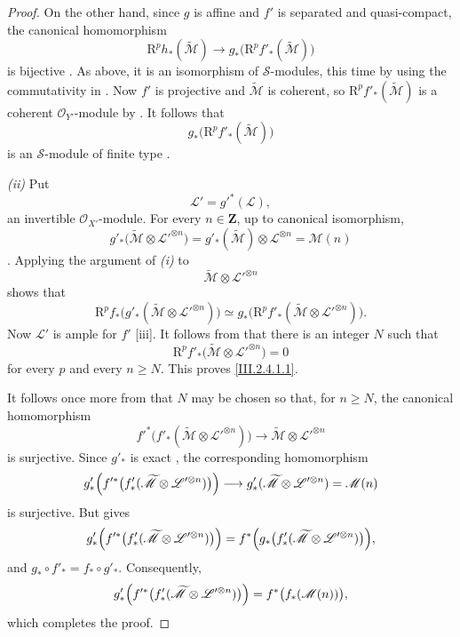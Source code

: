 \documentclass[oneside]{amsart}
\theoremstyle{ega-env-style}
\theoremstyle{ega-thm-env-style}
\theoremstyle{ega-defn-env-style}
\def\mathcal{\mathscr}
\def\sh{\mathcal}                   %
\def\bb{\mathbf}                    %
\def\geq{\geqslant}                 %
\def\RR{\mathrm{R}}                 %
\begin{document}
\begin{proof}
On the other hand, since $g$ is affine and $f'$ is separated and quasi-compact, the canonical homomorphism
\[
  \RR^p h_*(\widetilde{\sh{M}})
  \longrightarrow
  g_*\bigl(\RR^p f'_*(\widetilde{\sh{M}})\bigr)
\]
is bijective .
As above, it is an isomorphism of $\sh{S}$-modules, this time by using the commutativity in .
Now $f'$ is projective and $\widetilde{\sh{M}}$ is coherent, so $\RR^p f'_*(\widetilde{\sh{M}})$ is a coherent $\sh{O}_{Y'}$-module by .
It follows that
\[
  g_*\bigl(\RR^p f'_*(\widetilde{\sh{M}})\bigr)
\]
is an $\sh{S}$-module of finite type .

\emph{(ii)} Put
\[
  \sh{L}'=g'^*(\sh{L}),
\]
an invertible $\sh{O}_{X'}$-module.
For every $n\in\bb Z$, up to canonical isomorphism,
\[
  g'_*\bigl(\widetilde{\sh{M}}\otimes\sh{L}'^{\otimes n}\bigr)
  =
  g'_*(\widetilde{\sh{M}})\otimes\sh{L}^{\otimes n}
  =
  \sh{M}(n)
\]
.
Applying the argument of \emph{(i)} to
\[
  \widetilde{\sh{M}}\otimes\sh{L}'^{\otimes n}
\]
shows that
\[
  \RR^p f_*
  \bigl(g'_*(\widetilde{\sh{M}}\otimes\sh{L}'^{\otimes n})\bigr)
  \simeq
  g_*\bigl(\RR^p f'_*
  (\widetilde{\sh{M}}\otimes\sh{L}'^{\otimes n})\bigr).
\]
Now $\sh{L}'$ is ample for $f'$ [iii].
It follows from  that there is an integer $N$ such that
\[
  \RR^p f'_*
  \bigl(\widetilde{\sh{M}}\otimes\sh{L}'^{\otimes n}\bigr)=0
\]
for every $p$ and every $n\geq N$.
This proves \eqref{III.2.4.1.1}.

It follows once more from  that $N$ may be chosen so that, for $n\geq N$, the canonical homomorphism
\[
  f'^*\bigl(f'_*(\widetilde{\sh{M}}\otimes\sh{L}'^{\otimes n})\bigr)
  \longrightarrow
  \widetilde{\sh{M}}\otimes\sh{L}'^{\otimes n}
\]
is surjective.
Since $g'_*$ is exact , the corresponding homomorphism
\[
  g'_*\Bigl(
    f'^*\bigl(f'_*(\widetilde{\sh{M}}\otimes\sh{L}'^{\otimes n})\bigr)
  \Bigr)
  \longrightarrow
  g'_*(\widetilde{\sh{M}}\otimes\sh{L}'^{\otimes n})
  =\sh{M}(n)
\]
is surjective.
But  gives
\[
  g'_*\Bigl(
    f'^*\bigl(f'_*(\widetilde{\sh{M}}\otimes\sh{L}'^{\otimes n})\bigr)
  \Bigr)
  =
  f^*\Bigl(
    g_*\bigl(f'_*(\widetilde{\sh{M}}\otimes\sh{L}'^{\otimes n})\bigr)
  \Bigr),
\]
and $g_*\circ f'_*=f_*\circ g'_*$.
Consequently,
\[
  g'_*\Bigl(
    f'^*\bigl(f'_*(\widetilde{\sh{M}}\otimes\sh{L}'^{\otimes n})\bigr)
  \Bigr)
  =
  f^*\bigl(f_*(\sh{M}(n))\bigr),
\]
which completes the proof.
\end{proof}
\end{document}
